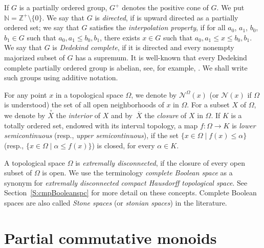 \documentclass[psamsfonts,reqno]{memo-l}
\theoremstyle{plain}
\theoremstyle{definition}
\theoremstyle{remark}
\numberwithin{equation}{section}
\newcommand{\Nh}{\mathcal{N}}
\newcommand{\ol}[1]{\,\overline{\!#1}}
\newcommand{\lsc}{lower semicontinuous}
\newcommand{\usc}{upper semicontinuous}
\newcommand{\NN}{\mathbb{N}}
\newcommand{\ZZ}{\mathbb{Z}}
\newcommand{\set}[1]{\{#1\}}
\newcommand{\setm}[2]{\set{#1\mid#2}}
\begin{document}
If $G$ is a partially ordered group, $G^+$
denotes the positive cone of $G$. We put\index{nzzn@$\NN$|ii}
$\NN=\ZZ^+\setminus\set{0}$.
We say that $G$ is
 \emph{directed},
if is upward directed as a partially
ordered set; we say that $G$ satisfies the
 \emph{interpolation property}, if for all
$a_0$, $a_1$, $b_0$, $b_1\in G$ such that $a_0,a_1\leq b_0,b_1$, there exists
$x\in G$ such that $a_0,a_1\leq x\leq b_0,b_1$. We say that $G$ is
\emph{Dedekind complete}, if it is directed and every nonempty majorized
subset of $G$ has a supremum. It is well-known that every Dedekind complete
partially ordered group is abelian, see, for example,
\cite[Theorem~28]{Birk}. We shall write such groups using additive
notation.

For any point $x$ in a topological space $\Omega$, we denote by
$\Nh^\Omega(x)$\index{Nzzh@$\Nh^\Omega(x)$|ii}
(or $\Nh(x)$ if $\Omega$ is understood) the set of all open
neighborhoods of $x$ in $\Omega$. For a subset $X$ of $\Omega$, we denote by
$\overset{\,\circ}{X}$ the \emph{interior}
 of $X$ and by
$\ol{X}$ the \emph{closure}
\index{Xzzclosure@$\ol{X}$|ii} of $X$ in $\Omega$. If $K$ is a
totally ordered set, endowed with its interval topology, a map
$f\colon\Omega\to K$ is 
\emph{\lsc} (resp., \emph{\usc}), if the
set $\setm{x\in\Omega}{f(x)\leq\alpha}$ (resp.,
$\setm{x\in\Omega}{\alpha\leq f(x)}$) is closed, for every $\alpha\in K$.

A topological space $\Omega$ is \emph{extremally disconnected}, if the
closure of every open subset of $\Omega$ is open.
We use the terminology \emph{complete Boolean space} as
a synonym for \emph{extremally disconnected compact Hausdorff topological
space}. See Section~\ref{S:cmpBooleanspc} for more detail on these concepts.
Complete Boolean spaces are also called
\emph{Stone spaces} (or \emph{stonian spaces}) in the
literature.


\chapter{Partial commutative monoids}\label{Ch:PartMon}
\end{document}
